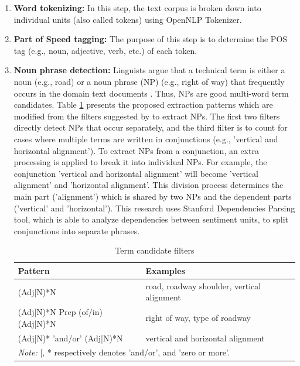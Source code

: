\documentclass[Journal, InsideFigs, DoubleSpace]{ascelike} %
\begin{document}
\begin{enumerate}
	\item \textbf{Word tokenizing:} In this step, the text corpus is broken down into individual units (also called tokens) using OpenNLP Tokenizer.
	\item \textbf{Part of Speed tagging:} The purpose of this step is to determine the POS tag (e.g., noun, adjective, verb, etc.) of each token.
	\item \textbf{Noun phrase detection:} Linguists argue that a technical term is either a noun (e.g., road) or a noun phrase (NP) (e.g., right of way) that frequently occurs in the domain text documents \cite{justeson95}. Thus, NPs are good multi-word term candidates. Table \ref{table:term_filter} presents the proposed extraction patterns which are modified from the filters suggested by \cite{justeson95} to extract NPs. The first two filters directly detect NPs that occur separately, and the third filter is to count for cases where multiple terms are written in conjunctions (e.g., 'vertical and horizontal alignment'). To extract NPs from a conjunction, an extra processing is applied to break it into individual NPs. For example, the conjunction 'vertical and horizontal alignment' will become 'vertical alignment' and 'horizontal alignment'. This division process determines the main part ('alignment') which is shared by two NPs and the dependent parts ('vertical' and 'horizontal'). This research uses Stanford Dependencies Parsing tool, which is able to analyze dependencies between sentiment units, to split conjunctions into separate phrases. 
	\begin{table} [t]
		\caption{Term candidate filters}
		\label{table:term_filter}
		\centering
		\small
		\renewcommand{\arraystretch}{1.25}
		\begin{tabular}{l l}
			\hline
			\textbf{Pattern} & \textbf{Examples}\\
			\hline
			(Adj|N)*N		& road, roadway shoulder, vertical alignment\\
			(Adj|N)*N Prep (of/in) (Adj|N)*N	&	right of way, type of roadway\\
			(Adj|N)* 'and/or' (Adj|N)*N & vertical and horizontal alignment\\
			\hline
			\multicolumn{2}{l}{\textit{Note:} |, * respectively denotes 'and/or', and 'zero or more'.  } \\
			\hline
		\end{tabular}
		\normalsize
	\end{table}
	\par

\end{enumerate}
\end{document}
